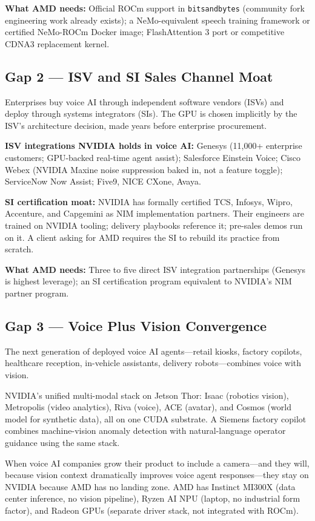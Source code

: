 \documentclass[12pt,a4paper]{article}
\begin{document}
\textbf{What AMD needs:} Official ROCm support in \texttt{bitsandbytes}
(community fork engineering work already exists); a NeMo-equivalent speech
training framework or certified NeMo-ROCm Docker image; FlashAttention 3
port or competitive CDNA3 replacement kernel.

\subsection{Gap 2 --- ISV and SI Sales Channel Moat}

Enterprises buy voice AI through independent software vendors (ISVs) and
deploy through systems integrators (SIs).  The GPU is chosen implicitly by
the ISV's architecture decision, made years before enterprise procurement.

\textbf{ISV integrations NVIDIA holds in voice AI:} Genesys (11{,}000+
enterprise customers; GPU-backed real-time agent assist); Salesforce Einstein
Voice; Cisco Webex (NVIDIA Maxine noise suppression baked in, not a feature
toggle); ServiceNow Now Assist; Five9, NICE CXone, Avaya.

\textbf{SI certification moat:} NVIDIA has formally certified TCS, Infosys,
Wipro, Accenture, and Capgemini as NIM implementation partners.  Their
engineers are trained on NVIDIA tooling; delivery playbooks reference it;
pre-sales demos run on it.  A client asking for AMD requires the SI to
rebuild its practice from scratch.

\textbf{What AMD needs:} Three to five direct ISV integration partnerships
(Genesys is highest leverage); an SI certification program equivalent to
NVIDIA's NIM partner program.

\subsection{Gap 3 --- Voice Plus Vision Convergence}

The next generation of deployed voice AI agents---retail kiosks, factory
copilots, healthcare reception, in-vehicle assistants, delivery
robots---combines voice with vision.

NVIDIA's unified multi-modal stack on Jetson Thor: Isaac (robotics vision),
Metropolis (video analytics), Riva (voice), ACE (avatar), and Cosmos (world
model for synthetic data), all on one CUDA substrate.  A Siemens factory
copilot combines machine-vision anomaly detection with natural-language
operator guidance using the same stack.

When voice AI companies grow their product to include a camera---and they
will, because vision context dramatically improves voice agent responses---they
stay on NVIDIA because AMD has no landing zone.  AMD has Instinct MI300X
(data center inference, no vision pipeline), Ryzen AI NPU (laptop, no
industrial form factor), and Radeon GPUs (separate driver stack, not
integrated with ROCm).
\end{document}
